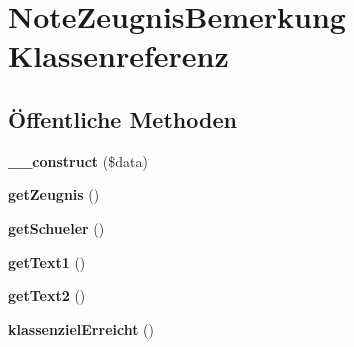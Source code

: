 \hypertarget{class_note_zeugnis_bemerkung}{}\section{Note\+Zeugnis\+Bemerkung Klassenreferenz}
\label{class_note_zeugnis_bemerkung}
\subsection*{Öffentliche Methoden}
\begin{DoxyCompactItemize}
\item 
\mbox{\label{class_note_zeugnis_bemerkung_a22baa2b4e4d42584545aa130e74f44a4}} 
{\bfseries \+\_\+\+\_\+construct} (\$data)
\item 
\mbox{\label{class_note_zeugnis_bemerkung_a365d525a5601bcf9e5da4a7ff796662c}} 
{\bfseries get\+Zeugnis} ()
\item 
\mbox{\label{class_note_zeugnis_bemerkung_a7989d1623bf013b8d163c3c0b6c520bf}} 
{\bfseries get\+Schueler} ()
\item 
\mbox{\label{class_note_zeugnis_bemerkung_ae2320e4364bb6f0a173c32d9d2d0f008}} 
{\bfseries get\+Text1} ()
\item 
\mbox{\label{class_note_zeugnis_bemerkung_a0c9774a7789d2a1a1bfd6481f7a94fef}} 
{\bfseries get\+Text2} ()
\item 
\mbox{\label{class_note_zeugnis_bemerkung_a4566a9ada7df402d5ad768594c6953c6}} 
{\bfseries klassenziel\+Erreicht} ()
\end{DoxyCompactItemize}
